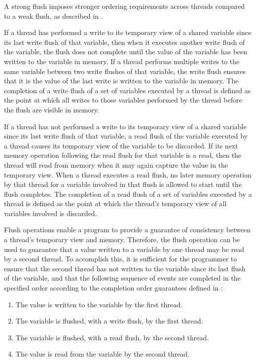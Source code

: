 A strong flush imposes stronger ordering requirements across threads
compared to a weak flush, as described in
.

If a thread has performed a write to its temporary view of a shared variable
since its last write flush of that variable, then when it executes another
write flush of the variable, the flush does not complete until the value of
the variable has been written to the variable in memory.  If a thread performs
multiple writes to the same variable between two write flushes of that
variable, the write flush ensures that it is the value of the last write is
written to the variable in memory. The completion of a write flush of a set of
variables executed by a thread is defined as the point at which all writes to
those variables performed by the thread before the flush are visible in
memory.

If a thread has not performed a write to its temporary view of a shared
variable since its last write flush of that variable, a read flush of the
variable executed by a thread causes its temporary view of the variable to be
discarded. If its next memory operation following the read flush for that
variable is a read, then the thread will read from memory when it may again
capture the value in the temporary view. When a thread executes a read flush,
no later memory operation by that thread for a variable involved in that flush
is allowed to start until the flush completes. The completion of a read flush
of a set of variables executed by a thread is defined as the point at which
the thread's temporary view of all variables involved is discarded.

Flush operations enable a program to provide a guarantee of consistency
between a thread’s temporary view and memory. Therefore, the flush operation can
be used to guarantee that a value written to a variable by one thread may be
read by a second thread. To accomplish this, it is sufficient for the
programmer to ensure that the second thread has not written to the variable
since its last flush of the variable, and that the following sequence of
events are completed in the specified order according to the completion order
guarantees defined in : 

\begin{enumerate}
\item The value is written to the variable by the first thread.   

\item The variable is flushed, with a write flush, by the first thread.    

\item The variable is flushed, with a read flush, by the second thread.

\item The value is read from the variable by the second thread.
\end{enumerate}

